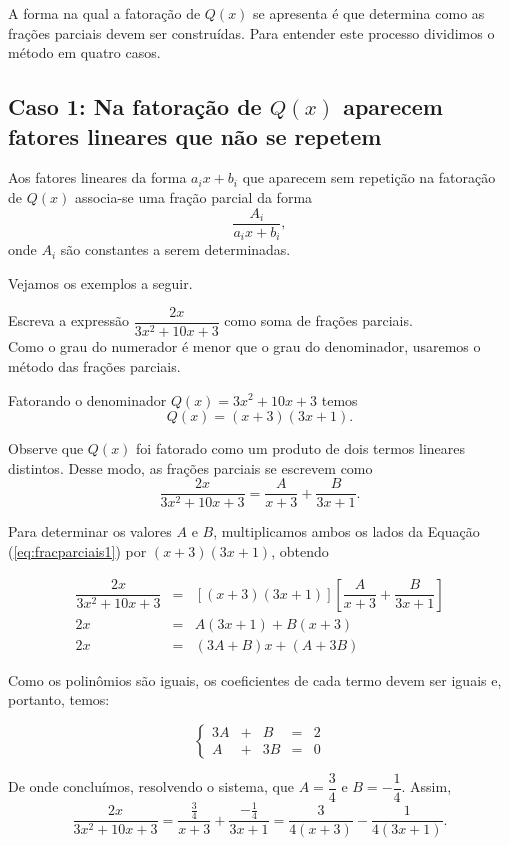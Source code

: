 A forma na qual a fatoração de $Q(x)$ se apresenta é que determina como as frações parciais devem ser construídas. Para entender este processo dividimos o método em quatro casos.


\subsection{Caso 1: Na fatoração de $Q(x)$ aparecem fatores lineares que não se repetem}

Aos fatores lineares da forma $a_i x + b_i$ que aparecem sem repetição na fatoração de $Q(x)$ associa-se uma fração parcial da forma $$\dfrac{A_i}{a_i x+b_i},$$
onde $A_i$ são constantes a serem determinadas.

Vejamos os exemplos a seguir.

\begin{exem}
    Escreva a expressão $\dfrac{2x}{3x^2 + 10x +3}$ como soma de frações parciais. \\[10pt]

    Como o grau do numerador é menor que o grau do denominador, usaremos o método das frações parciais.

    Fatorando o denominador $Q(x) = 3x^2 + 10x +3$ temos $$Q(x) = (x+3)(3x+1).$$

    Observe que $Q(x)$ foi fatorado como um produto de dois termos lineares distintos. Desse modo, as frações parciais se escrevem como 
    \begin{equation}
    \label{eq:fracparciais1}
    \dfrac{2x}{3x^2 + 10x +3} = \dfrac{A}{x+3} + \dfrac{B}{3x+1}.
    \end{equation}

    Para determinar os valores $A$ e $B$, multiplicamos ambos os lados da Equação (\ref{eq:fracparciais1}) por $(x+3)(3x+1)$, obtendo

    \begin{eqnarray*}
    [(x+3)(3x+1)]\dfrac{2x}{3x^2 + 10x +3} & = & [(x+3)(3x+1)] \left[\dfrac{A}{x+3} + \dfrac{B}{3x+1}\right]\\[5pt]
    2x & =& A(3x+1) + B(x+3)\\[5pt]
    2x & =& (3A + B)x + (A + 3B)
    \end{eqnarray*}

    Como os polinômios são iguais, os coeficientes de cada termo devem ser iguais e, portanto, temos:

    \begin{equation*}
    \left\{ \begin{array}{ccccc} 3A & + & B &=& 2 \\[5pt]
    A & + & 3B & =& 0
    \end{array}
    \right.    
    \end{equation*}

    De onde concluímos, resolvendo o sistema, que $A = \dfrac{3}{4}$ e $B = -\dfrac{1}{4}$. Assim, $$\dfrac{2x}{3x^2 + 10x +3} = \dfrac{\frac{3}{4}}{x+3} + \dfrac{-\frac{1}{4}}{3x+1}  = \dfrac{3}{4(x+3)} -\dfrac{1}{4(3x+1)}.$$
\end{exem}

